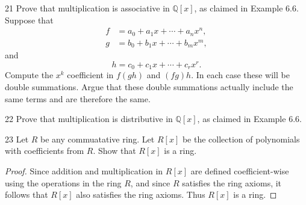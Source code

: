 \begin{problem}{21}
    Prove that multiplication is associative in $\mathbb{Q}[x]$, as claimed in
    Example 6.6. Suppose that
    \begin{align*}
        f &= a_0 + a_1x + \cdots + a_nx^n, \\
        g &= b_0 + b_1x + \cdots + b_mx^m,
    \end{align*}
    and
    \[h = c_0 + c_1x + \cdots + c_rx^r.\]
    Compute the $x^k$ coefficient in $f(gh)$ and $(fg)h$. In each case these will be
    double summations. Argue that these double summations actually include the same
    terms and are therefore the same.
\end{problem}
\unsolved

\begin{problem}{22}
    Prove that multiplication is distributive in $\mathbb{Q}[x]$, as claimed in
    Example 6.6.
\end{problem}
\unsolved

\begin{problem}{23}
    Let $R$ be any commuatative ring.
    Let $R[x]$ be the collection of polynomials with 
    coefficients from $R$. Show that $R[x]$ is a ring.
\end{problem}
\solved
\begin{proof}
    Since addition and multiplication in $R[x]$ are defined coefficient-wise
    using the operations in the ring $R$, and since $R$ satisfies the ring axioms,
    it follows that $R[x]$ also satisfies the ring axioms. Thus $R[x]$ is a ring.
\end{proof}
